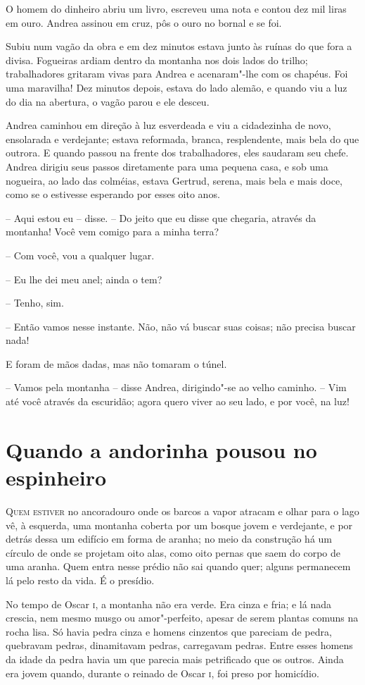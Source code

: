 O homem do dinheiro abriu um livro, escreveu uma nota e contou dez mil
liras em ouro. Andrea assinou em cruz, pôs o ouro no bornal e se foi.

Subiu num vagão da obra e em dez minutos estava junto às ruínas do que
fora a divisa. Fogueiras ardiam dentro da montanha nos dois lados do
trilho; trabalhadores gritaram vivas para Andrea e acenaram"-lhe com
os chapéus. Foi uma maravilha! Dez minutos depois, estava do lado
alemão, e quando viu a luz do dia na abertura, o vagão parou e ele
desceu.

Andrea caminhou em direção à luz esverdeada e viu a cidadezinha de novo,
ensolarada e verdejante; estava reformada, branca, resplendente, mais
bela do que outrora. E quando passou na frente dos trabalhadores, eles
saudaram seu chefe. Andrea dirigiu seus passos diretamente para uma
pequena casa, e sob uma nogueira, ao lado das colméias, estava Gertrud,
serena, mais bela e mais doce, como se o estivesse esperando por esses
oito anos.

-- Aqui estou eu -- disse. -- Do jeito que eu disse que chegaria, através
da montanha! Você vem comigo para a minha terra?

-- Com você, vou a qualquer lugar.

-- Eu lhe dei meu anel; ainda o tem?

-- Tenho, sim.

-- Então vamos nesse instante. Não, não vá buscar suas coisas; não
precisa buscar nada!

E foram de mãos dadas, mas não tomaram o túnel.

-- Vamos pela montanha -- disse Andrea, dirigindo"-se ao velho caminho. --
Vim até você através da escuridão; agora quero viver ao seu lado, e por
você, na luz!

\chapter{Quando a andorinha pousou no espinheiro}


\textsc{Quem estiver} no ancoradouro onde os barcos a vapor atracam e olhar para
o lago vê, à esquerda, uma montanha coberta por um bosque jovem e
verdejante, e por detrás dessa um edifício em forma de aranha; no meio
da construção há um círculo de onde se projetam oito alas, como oito
pernas que saem do corpo de uma aranha. Quem entra nesse prédio não sai
quando quer; alguns permanecem lá pelo resto da vida. É o presídio.

No tempo de Oscar \textsc{i}, a montanha não era verde. Era cinza e fria; e lá
nada crescia, nem mesmo musgo ou amor"-perfeito, apesar de serem
plantas comuns na rocha lisa. Só havia pedra cinza e homens cinzentos
que pareciam de pedra, quebravam pedras, dinamitavam pedras, carregavam
pedras. Entre esses homens da idade da pedra havia um que parecia mais
petrificado que os outros. Ainda era jovem quando, durante o reinado de
Oscar \textsc{i}, foi preso por homicídio.

